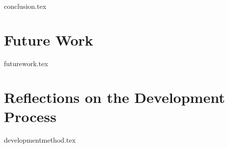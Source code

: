 {conclusion.tex}
\chapter{Future Work}
{futurework.tex}
\chapter{Reflections on the Development Process}
{developmentmethod.tex}
